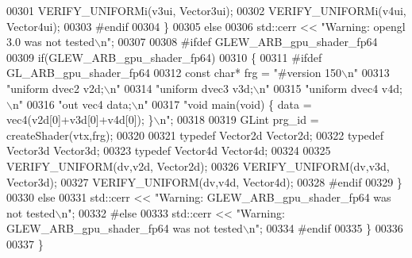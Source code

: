 \begin{DoxyCode}
00301       VERIFY\_UNIFORMi(v3ui, Vector3ui);
00302       VERIFY\_UNIFORMi(v4ui, Vector4ui);
00303 \textcolor{preprocessor}{      #endif}
00304     \}
00305     \textcolor{keywordflow}{else}
00306       std::cerr << \textcolor{stringliteral}{"Warning: opengl 3.0 was not tested\(\backslash\)n"};
00307     
00308 \textcolor{preprocessor}{    #ifdef GLEW\_ARB\_gpu\_shader\_fp64}
00309     \textcolor{keywordflow}{if}(GLEW\_ARB\_gpu\_shader\_fp64)
00310     \{
00311 \textcolor{preprocessor}{      #ifdef GL\_ARB\_gpu\_shader\_fp64}
00312       \textcolor{keyword}{const} \textcolor{keywordtype}{char}* frg = \textcolor{stringliteral}{"#version 150\(\backslash\)n"}
00313         \textcolor{stringliteral}{"uniform dvec2 v2d;\(\backslash\)n"}
00314         \textcolor{stringliteral}{"uniform dvec3 v3d;\(\backslash\)n"}
00315         \textcolor{stringliteral}{"uniform dvec4 v4d;\(\backslash\)n"}
00316         \textcolor{stringliteral}{"out vec4 data;\(\backslash\)n"}
00317         \textcolor{stringliteral}{"void main(void) \{ data = vec4(v2d[0]+v3d[0]+v4d[0]); \}\(\backslash\)n"};
00318         
00319       GLint prg\_id = createShader(vtx,frg);
00320       
00321       \textcolor{keyword}{typedef} Vector2d Vector2d;
00322       \textcolor{keyword}{typedef} Vector3d Vector3d;
00323       \textcolor{keyword}{typedef} Vector4d Vector4d;
00324       
00325       VERIFY\_UNIFORM(dv,v2d, Vector2d);
00326       VERIFY\_UNIFORM(dv,v3d, Vector3d);
00327       VERIFY\_UNIFORM(dv,v4d, Vector4d);
00328 \textcolor{preprocessor}{      #endif}
00329     \}
00330     \textcolor{keywordflow}{else}
00331       std::cerr << \textcolor{stringliteral}{"Warning: GLEW\_ARB\_gpu\_shader\_fp64 was not tested\(\backslash\)n"};
00332 \textcolor{preprocessor}{    #else}
00333       std::cerr << \textcolor{stringliteral}{"Warning: GLEW\_ARB\_gpu\_shader\_fp64 was not tested\(\backslash\)n"};
00334 \textcolor{preprocessor}{    #endif}
00335   \}
00336   
00337 \}
\end{DoxyCode}
